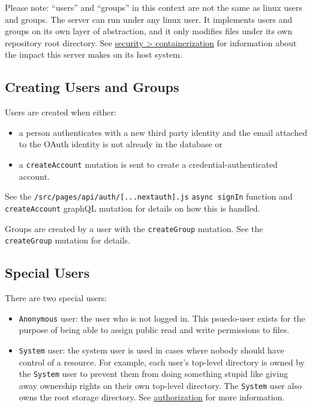 Please note: ``users'' and ``groups'' in this context are not the same
as linux users and groups. The server can run under any linux user. It
implements users and groups on its own layer of abstraction, and it only
modifies files under its own repository root directory. See
\href{/docs/authentication_verification_and_security.md}{security
\textgreater{} containerization} for information about the impact this
server makes on its host system.

\hypertarget{creating-users-and-groups}{%
\subsection{Creating Users and Groups}\label{creating-users-and-groups}}

Users are created when either:

\begin{itemize}
\tightlist
\item
  a person authenticates with a new third party identity and the email
  attached to the OAuth identity is not already in the database or
\item
  a \texttt{createAccount} mutation is sent to create a
  credential-authenticated account.
\end{itemize}

See the \texttt{/src/pages/api/auth/{[}...nextauth{]}.js}
\texttt{async\ signIn} function and \texttt{createAccount} graphQL
mutation for details on how this is handled.

Groups are created by a user with the \texttt{createGroup} mutation. See
the \texttt{createGroup} mutation for details.

\hypertarget{special-users}{%
\subsection{Special Users}\label{special-users}}

There are two special users:

\begin{itemize}
\tightlist
\item
  \texttt{Anonymous} user: the user who is not logged in. This
  psuedo-user exists for the purpose of being able to assign public read
  and write permissions to files.
\item
  \texttt{System} user: the system user is used in cases where nobody
  should have control of a resource. For example, each user's top-level
  directory is owned by the \texttt{System} user to prevent them from
  doing something stupid like giving away ownership rights on their own
  top-level directory. The \texttt{System} user also owns the root
  storage directory. See \href{/docs/authorization.md}{authorization}
  for more information.
\end{itemize}

